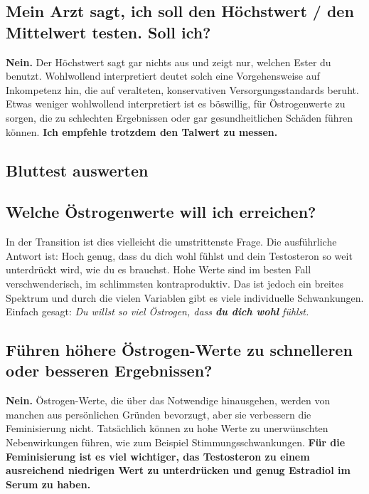 \documentclass{article}
\begin{document}
\subsection{Mein Arzt sagt, ich soll den Höchstwert / den Mittelwert testen. Soll ich?}

\textbf{Nein.} Der Höchstwert sagt gar nichts aus und zeigt nur, welchen Ester du benutzt. Wohlwollend interpretiert deutet solch eine Vorgehensweise auf Inkompetenz hin, die auf veralteten, konservativen Versorgungsstandards beruht. Etwas weniger wohlwollend interpretiert ist es böswillig, für Östrogenwerte zu sorgen, die zu schlechten Ergebnissen oder gar gesundheitlichen Schäden führen können. \textbf{Ich empfehle trotzdem den Talwert zu messen.}

\subsection*{Bluttest auswerten}

\subsection{Welche Östrogenwerte will ich erreichen?}

In der Transition ist dies vielleicht die umstrittenste Frage. Die ausführliche Antwort ist: Hoch genug, dass du dich wohl fühlst und dein Testosteron so weit unterdrückt wird, wie du es brauchst. Hohe Werte sind im besten Fall verschwenderisch, im schlimmsten kontraproduktiv. Das ist jedoch ein breites Spektrum und durch die vielen Variablen gibt es viele individuelle Schwankungen. Einfach gesagt: \textit{Du willst so viel Östrogen, dass \textbf{du dich wohl} fühlst.}

\subsection{Führen höhere Östrogen-Werte zu schnelleren oder besseren Ergebnissen?}

\textbf{Nein.} Östrogen-Werte, die über das Notwendige hinausgehen, werden von manchen aus persönlichen Gründen bevorzugt, aber sie verbessern die Feminisierung nicht. Tatsächlich können zu hohe Werte zu unerwünschten Nebenwirkungen führen, wie zum Beispiel Stimmungsschwankungen. \textbf{Für die Feminisierung ist es viel wichtiger, das Testosteron zu einem ausreichend niedrigen Wert zu unterdrücken und genug Estradiol im Serum zu haben.}
\end{document}
